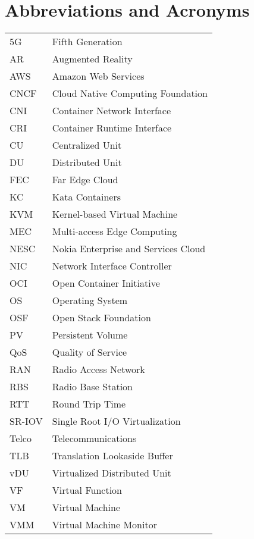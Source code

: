 \chapter*{Abbreviations and Acronyms}

\noindent
\begin{longtable}{@{}p{}p{}@{}}
5G & Fifth Generation \\
AR & Augmented Reality \\
AWS & Amazon Web Services \\
CNCF & Cloud Native Computing Foundation \\
CNI & Container Network Interface \\
CRI & Container Runtime Interface \\
CU & Centralized Unit \\
DU & Distributed Unit \\
FEC & Far Edge Cloud \\
KC & Kata Containers \\
KVM & Kernel-based Virtual Machine \\
MEC & Multi-access Edge Computing \\
NESC & Nokia Enterprise and Services Cloud \\
NIC & Network Interface Controller \\
OCI & Open Container Initiative \\
OS & Operating System \\
OSF & Open Stack Foundation \\
PV & Persistent Volume \\
QoS & Quality of Service \\
RAN & Radio Access Network \\
RBS & Radio Base Station \\
RTT & Round Trip Time \\
SR-IOV & Single Root I/O Virtualization \\
Telco & Telecommunications \\
TLB & Translation Lookaside Buffer \\
vDU & Virtualized Distributed Unit \\
VF & Virtual Function \\
VM & Virtual Machine \\
VMM & Virtual Machine Monitor \\



\end{longtable}
